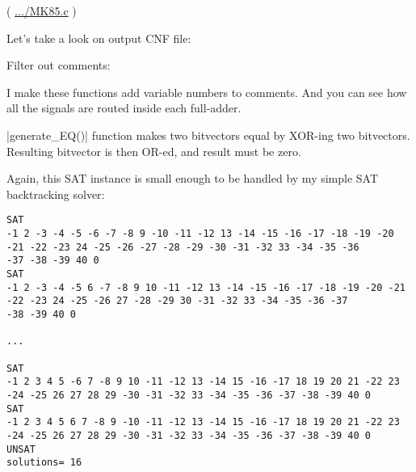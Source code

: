 ( \url{.../MK85.c} )

Let's take a look on output CNF file:



Filter out comments:



I make these functions add variable numbers to comments.
And you can see how all the signals are routed inside each full-adder.

|generate\_EQ()| function makes two bitvectors equal by XOR-ing two bitvectors.
Resulting bitvector is then OR-ed, and result must be zero.

Again, this SAT instance is small enough to be handled by my simple SAT backtracking solver:

\begin{lstlisting}
SAT
-1 2 -3 -4 -5 -6 -7 -8 9 -10 -11 -12 13 -14 -15 -16 -17 -18 -19 -20 -21 -22 -23 24 -25 -26 -27 -28 -29 -30 -31 -32 33 -34 -35 -36
-37 -38 -39 40 0
SAT
-1 2 -3 -4 -5 6 -7 -8 9 10 -11 -12 13 -14 -15 -16 -17 -18 -19 -20 -21 -22 -23 24 -25 -26 27 -28 -29 30 -31 -32 33 -34 -35 -36 -37
-38 -39 40 0

...

SAT
-1 2 3 4 5 -6 7 -8 9 10 -11 -12 13 -14 15 -16 -17 18 19 20 21 -22 23 -24 -25 26 27 28 29 -30 -31 -32 33 -34 -35 -36 -37 -38 -39 40 0
SAT
-1 2 3 4 5 6 7 -8 9 -10 -11 -12 13 -14 15 -16 -17 18 19 20 21 -22 23 -24 -25 26 27 28 29 -30 -31 -32 33 -34 -35 -36 -37 -38 -39 40 0
UNSAT
solutions= 16
\end{lstlisting}


